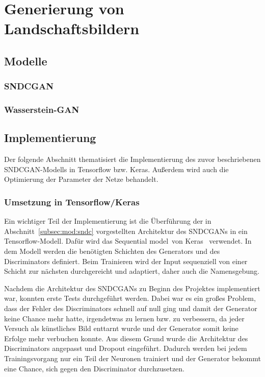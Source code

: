  \chapter{Generierung von Landschaftsbildern}\label{chp:bildgenerierung} %
 \glsresetall
 
 \section{Modelle}%
 
 \subsection{SNDCGAN} %
 
 \subsection{Wasserstein-GAN} %
 
  \section{Implementierung} %
 
 Der folgende Abschnitt thematisiert die Implementierung des zuvor beschriebenen SNDCGAN-Modells in Tensorflow bzw. Keras. Außerdem wird auch die Optimierung der Parameter der Netze behandelt.
 
 \subsection{Umsetzung in Tensorflow/Keras}\label{subsec:imp:sndc}
 
 Ein wichtiger Teil der Implementierung ist die Überführung der in Abschnitt~\ref{subsec:mod:sndc} vorgestellten Architektur des SNDCGANs in ein Tensorflow-Modell. Dafür wird das \glqq Sequential model\grqq\ von Keras~\cite{keras:SequentialModel} verwendet. In dem Modell werden die benötigten Schichten des Generators und des Discriminators definiert. Beim Trainieren wird der Input sequenziell von einer Schicht zur nächsten durchgereicht und adaptiert, daher auch die Namensgebung.  
 
 Nachdem die Architektur des SNDCGANs zu Beginn des Projektes implementiert war, konnten erste Tests durchgeführt werden. Dabei war es ein großes Problem, dass der Fehler des Discriminators schnell auf null ging und damit der Generator keine Chance mehr hatte, irgendetwas zu lernen bzw. zu verbessern, da jeder Versuch als künstliches Bild enttarnt wurde und der Generator somit keine Erfolge mehr verbuchen konnte. Aus diesem Grund wurde die Architektur des Discriminators angepasst und Dropout eingeführt. Dadurch werden bei jedem Trainingsvorgang nur ein Teil der Neuronen trainiert und der Generator bekommt eine Chance, sich gegen den Discriminator durchzusetzen.
 
